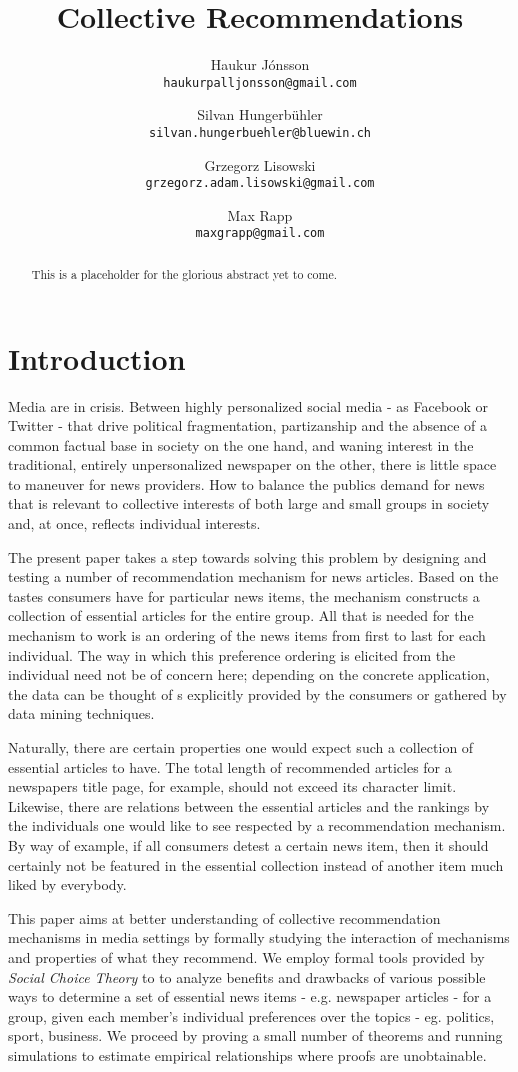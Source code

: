 \documentclass{article}
\title{Collective Recommendations}
\author{
    Haukur J{\'o}nsson \\    \texttt{haukurpalljonsson@gmail.com}\\
    \and
    Silvan Hungerb{\"u}hler \\   \texttt{silvan.hungerbuehler@bluewin.ch}\\
    \and
    Grzegorz Lisowski \\  \texttt{grzegorz.adam.lisowski@gmail.com}\\
    \and
    Max Rapp \\  \texttt{maxgrapp@gmail.com}
}
\begin{document}
\maketitle

\begin{abstract}
This is a placeholder for the glorious abstract yet to come.
\end{abstract}

\section{Introduction}\label{introduction}
Media are in crisis. Between highly personalized social media - as Facebook or Twitter - that drive political 
fragmentation, partizanship and the absence of a common factual base in society on the one hand, 
and waning interest in the traditional, entirely unpersonalized newspaper on the other, there is little space to maneuver for news providers. 
 How to balance the publics demand for news that is relevant to collective interests of both large and small groups in society and, at once, 
 reflects individual interests.
 
The present paper takes a step towards solving this problem by designing and testing a number of recommendation mechanism for news articles. 
 Based on the tastes consumers have for particular news items, the mechanism constructs a collection of essential articles for the entire group. 
 All that is needed for the mechanism to work is an ordering of the news items from first to last for each individual. 
 The way in which this preference ordering is elicited from the individual need not be of concern here; 
 depending on the concrete application, the data can be thought of s explicitly provided by the consumers or gathered by data mining techniques.
 
 Naturally, there are certain properties one would expect such a collection of essential articles to have. 
 The total length of recommended articles for a newspapers title page, for example, should not exceed its character limit. 
 Likewise, there are relations between the essential articles and the rankings by the individuals one would like to see respected by a recommendation mechanism. 
 By way of example, if all consumers detest a certain news item, 
 then it should certainly not be featured in the essential collection instead of another item much liked by everybody.
 
This paper aims at better understanding of collective recommendation mechanisms in media settings by
formally studying the interaction of mechanisms and properties of what they recommend. 
We employ formal tools provided by \emph{Social Choice Theory} to to analyze benefits and drawbacks of various possible ways to determine a set of essential news items 
- e.g. newspaper articles - for a group, given each member's individual preferences over the topics - eg. politics, sport, business.
We proceed by proving a small number of theorems and running simulations to estimate empirical relationships where proofs are unobtainable.  
\end{document}
